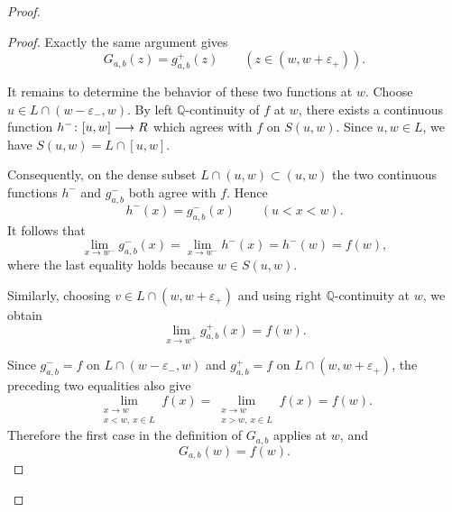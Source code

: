 \documentclass[11pt]{amsart} %
\theoremstyle{definition}
\newcommand{\R}{\mathbb{R}}
\begin{document}
\begin{proof}
\begin{proof}
Exactly the same argument gives
\begin{equation}\label{eq:Gab-right-piece}
G_{a,b}(z)=g^+_{a,b}(z)
\qquad
(z\in(w,w+\varepsilon_+)).
\end{equation}

It remains to determine the behavior of these two functions at $w$.
Choose $u\in L\cap(w-\varepsilon_-,w)$. 
By left $\mathbb Q$-continuity of $f$ at $w$, there exists a
continuous function $
h^-\colon [u,w]\longrightarrow\mathbb \R$
which agrees with $f$ on $S(u,w)$. Since $u,w\in L$, we have $S(u,w)=L\cap[u,w].$

Consequently, on the dense subset
$L\cap(u,w)\subset(u,w)$ 
the two continuous functions $h^-$ and $g^-_{a,b}$ both agree with
$f$. Hence
\begin{equation} 
h^-(x)=g^-_{a,b}(x)
\qquad (u<x<w).
\end{equation} 
It follows that
\begin{equation} 
\lim_{x\to w^-}g^-_{a,b}(x)
 =
\lim_{x\to w^-}h^-(x)
 =
h^-(w)
 =
f(w),
\end{equation} 
where the last equality holds because $w\in S(u,w)$.

Similarly, choosing $
v\in L\cap(w,w+\varepsilon_+)$ 
and using right $\mathbb Q$-continuity at $w$, we obtain
\begin{equation} 
\lim_{x\to w^+}g^+_{a,b}(x)=f(w).
\end{equation} 

Since $g^-_{a,b}=f$ on $L\cap(w-\varepsilon_-,w)$ and
$g^+_{a,b}=f$ on $L\cap(w,w+\varepsilon_+)$, the preceding two
equalities also give
\begin{equation} 
\lim_{\substack{x\to w\\x<w,\ x\in L}}f(x)
=
\lim_{\substack{x\to w\\x>w,\ x\in L}}f(x)
=
f(w).
\end{equation} 
Therefore the first case in the definition of $G_{a,b}$ applies at
$w$, and
\begin{equation} 
G_{a,b}(w)=f(w).
\end{equation} 


\end{proof}
\end{proof}
\end{document}
